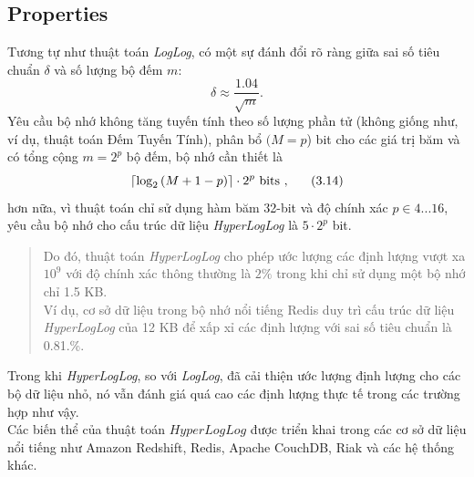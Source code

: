 \documentclass[a4paper,13pt]{article}
\theoremstyle{mytheor}
\begin{document}
\subsection*{Properties}
Tương tự như thuật toán \textit{LogLog}, có một sự đánh đổi rõ ràng giữa sai số tiêu chuẩn $\delta$ và số lượng bộ đếm $m$:
\[\delta \approx \frac{1.04}{\sqrt{m}}.\]
\indent Yêu cầu bộ nhớ không tăng tuyến tính theo số lượng phần tử (không giống như, ví dụ, thuật toán Đếm Tuyến Tính), 
phân bổ $(M=p$) bit cho các giá trị băm và có tổng cộng $m = 2^p$ bộ đếm, bộ nhớ cần thiết là
\[\lceil\log_2\left(M + 1 - p\right)\rceil\cdot2^p \text{ bits , \indent (3.14)}\]
hơn nữa, vì thuật toán chỉ sử dụng hàm băm 32-bit và độ chính xác $p \in 4...16$, yêu cầu bộ nhớ cho 
cấu trúc dữ liệu \textit{HyperLogLog} là $5\cdot 2^p$ bit.\\
\vspace{0.4cm}
\begin{quote}
    Do đó, thuật toán \textit{HyperLogLog} cho phép ước lượng các định lượng vượt xa $10^9$ với độ chính xác thông thường là $2\%$ 
    trong khi chỉ sử dụng một bộ nhớ chỉ 1.5 KB.\\
    Ví dụ, cơ sở dữ liệu trong bộ nhớ nổi tiếng Redis duy trì cấu trúc dữ liệu \textit{HyperLogLog} của 12 KB để xấp xỉ các định lượng 
    với sai số tiêu chuẩn là 0.81.\%.
    \vspace{0.25cm}
\end{quote}

Trong khi \textit{HyperLogLog}, so với \textit{LogLog}, đã cải thiện ước lượng định lượng cho các bộ dữ liệu nhỏ, 
nó vẫn đánh giá quá cao các định lượng thực tế trong các trường hợp như vậy.\\
Các biến thể của thuật toán $HyperLogLog$ được triển khai trong các cơ sở dữ liệu nổi tiếng như Amazon Redshift, Redis, Apache CouchDB, Riak 
và các hệ thống khác.
\end{document}
